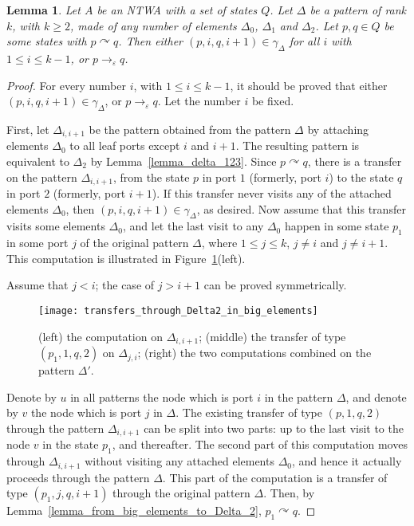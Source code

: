 \documentclass[12pt,a4paper]{article}
\newtheorem{lemma}{Lemma}
\theoremstyle{definition}
\renewcommand{\epsilon}{\varepsilon}
\begin{document}
\begin{lemma}\label{lemma_transfers_through_Delta2_in_big_elements}
Let $A$ be an NTWA with a set of states $Q$.
Let $\Delta$ be a pattern of rank $k$, with $k \geqslant 2$, 
made of any number of elements $\Delta_0$, $\Delta_1$ and $\Delta_2$.
Let $p,q \in Q$ be some states with $p \curvearrowright q$.
Then either $(p,i,q,i+1)\in \gamma_\Delta$ for all $i$ with $1 \leqslant i \leqslant k-1$,
or $p \to_\epsilon q$.
\end{lemma}
\begin{proof}
For every number $i$, with $1 \leqslant i \leqslant k-1$, it should be proved
that either $(p,i,q,i+1)\in \gamma_\Delta$, or $p \to_\epsilon q$.
Let the number $i$ be fixed.

First, let $\Delta_{i,i+1}$ be the pattern obtained from the pattern $\Delta$
by attaching elements $\Delta_0$ to all leaf ports except $i$ and $i+1$.
The resulting pattern is equivalent to $\Delta_2$
by Lemma~\ref{lemma_delta_123}.
Since $p \curvearrowright q$,
there is a transfer on the pattern $\Delta_{i,i+1}$,
from the state $p$ in port $1$ (formerly, port $i$)
to the state $q$ in port $2$ (formerly, port $i+1$).
If this transfer never visits any of the attached elements $\Delta_0$,
then $(p,i,q,i+1)\in \gamma_\Delta$, as desired.
Now assume that this transfer visits some elements $\Delta_0$,
and let the last visit to any $\Delta_0$
happen in some state $p_1$ in some port $j$ of the original pattern $\Delta$,
where $1 \leqslant j \leqslant k$, $j \neq i$ and $j \neq i+1$.
This computation is illustrated in Figure~\ref{f:transfers_through_Delta2_in_big_elements}(left).

Assume that $j<i$; the case of $j>i+1$ can be proved symmetrically.

\begin{figure}[t]
	\centerline{\texttt{[image: transfers\_through\_Delta2\_in\_big\_elements]}}
	\caption{(left) the computation on $\Delta_{i,i+1}$;
		(middle) the transfer of type $(p_1, 1, q, 2)$ on $\Delta_{j,i}$;
		(right) the two computations combined on the pattern $\Delta'$.}
	\label{f:transfers_through_Delta2_in_big_elements}
\end{figure}

Denote by $u$ in all patterns the node which is port $i$ in the pattern $\Delta$,
and denote by $v$ the node which is port $j$ in $\Delta$.
The existing transfer of type $(p,1,q,2)$ through the pattern $\Delta_{i,i+1}$
can be split into two parts:
up to the last visit to the node $v$ in the state $p_1$,
and thereafter.
The second part of this computation moves through $\Delta_{i,i+1}$
without visiting any attached elements $\Delta_0$,
and hence it actually proceeds through the pattern $\Delta$.
This part of the computation is a transfer of type $(p_1,j,q,i+1)$
through the original pattern $\Delta$.
Then, by Lemma~\ref{lemma_from_big_elements_to_Delta_2},
$p_1 \curvearrowright q$.


\end{proof}
\end{document}
